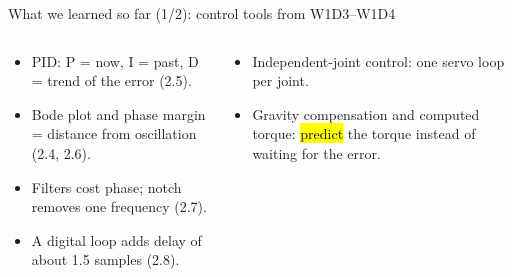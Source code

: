 \documentclass[aspectratio=169,10pt]{beamer}
\begin{document}
\begin{frame}[t]{What we learned so far (1/2): control tools from W1D3--W1D4}
\begin{columns}[T,onlytextwidth]
\begin{defbox}
\begin{itemize}\small
\item PID: P = now, I = past, D = trend of the error (2.5).
\item Bode plot and phase margin = distance from oscillation (2.4, 2.6).
\item Filters cost phase; notch removes one frequency (2.7).
\item A digital loop adds delay of about 1.5 samples (2.8).
\end{itemize}
\end{defbox}
\begin{defbox}
\begin{itemize}\small
\item Independent-joint control: one servo loop per joint.
\item Gravity compensation and computed torque: \hl{predict} the torque instead of waiting for the error.
\end{itemize}
\end{defbox}
\centering
{}
\end{columns}
\end{frame}
\end{document}
